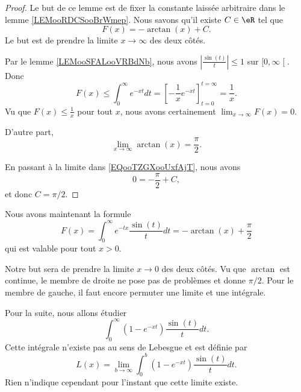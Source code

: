 \begin{proof}
	Le but de ce lemme est de fixer la constante laissée arbitraire dans le lemme \ref{LEMooRDCSooBrWmep}. Nous savons qu'il existe \( C\in \eR\) tel que
	\begin{equation}        \label{EQooTZGXooUxfAjT}
		F(x)=-\arctan(x)+C.
	\end{equation}
	Le but est de prendre la limite \( x\to\infty\) des deux côtés.

	Par le lemme \ref{LEMooSFALooVRBdNb}, nous avons \( | \frac{ \sin(t) }{ t } |\leq 1\) sur \( \mathopen[ 0 , \infty \mathclose[\). Donc
	\begin{equation}
		F(x)\leq \int_0^{\infty} e^{-xt}dt=\left[ -\frac{1}{ x } e^{-xt} \right]_{t=0}^{t=\infty}=\frac{1}{ x }.
	\end{equation}
	Vu que \( F(x)\leq \frac{1}{ x }\) pour tout \( x\), nous avons certainement \( \lim_{x\to \infty} F(x)=0\).

	D'autre part,
	\begin{equation}
		\lim_{x\to \infty} \arctan(x)=\frac{ \pi }{2}.
	\end{equation}

	En passant à la limite dans \eqref{EQooTZGXooUxfAjT}, nous avons
	\begin{equation}
		0=-\frac{ \pi }{2}+C,
	\end{equation}
	et donc \( C=\pi/2\).
\end{proof}

Nous avons maintenant la formule
\begin{equation}
	F(x)=\int_0^{\infty} e^{-tx}\frac{ \sin(t) }{ t }dt=-\arctan(x)+\frac{ \pi }{2}
\end{equation}
qui est valable pour tout \( x>0\).

Notre but sera de prendre la limite \( x\to 0\) des deux côtés. Vu que \( \arctan\) est continue, le membre de droite ne pose pas de problèmes et donne \( \pi/2\). Pour le membre de gauche, il faut encore permuter une limite et une intégrale.

Pour la suite, nous allons étudier\cite{BIBooCFXJooWrArNT}
\begin{equation}
	\int_0^{\infty}(1- e^{-xt})\frac{ \sin(t) }{ t }dt.
\end{equation}
Cette intégrale n'existe pas au sens de Lebesgue et est définie par
\begin{equation}
	L(x)=\lim_{b\to \infty} \int_0^b(1- e^{-xt})\frac{ \sin(t) }{ t }dt.
\end{equation}
Rien n'indique cependant pour l'instant que cette limite existe.

